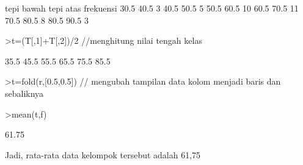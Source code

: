 \documentclass[a4paper,10pt]{article}
\begin{document}
\begin{eulernotebook}
\begin{eulercomment}
\begin{eulercomment}
\begin{eulercomment}
\begin{eulercomment}
\begin{eulercomment}
\begin{eulercomment}
\begin{eulercomment}
\begin{eulercomment}
\begin{eulercomment}
\begin{eulercomment}
\begin{euleroutput}
   tepi bawah tepi atas frekuensi
         30.5      40.5         3
         40.5      50.5         5
         50.5      60.5        10
         60.5      70.5        11
         70.5      80.5         8
         80.5      90.5         3
\end{euleroutput}
\begin{eulerprompt}
>t=(T[,1]+T[,2])/2  //menghitung nilai tengah kelas
\end{eulerprompt}
\begin{euleroutput}
           35.5 
           45.5 
           55.5 
           65.5 
           75.5 
           85.5 
\end{euleroutput}
\begin{eulerprompt}
>t=fold(r,[0.5,0.5]) // mengubah tampilan data kolom menjadi baris dan sebaliknya
\end{eulerprompt}
\begin{euleroutput}
  [35.5,  45.5,  55.5,  65.5,  75.5,  85.5]
\end{euleroutput}
\begin{eulerprompt}
>mean(t,f)
\end{eulerprompt}
\begin{euleroutput}
  61.75
\end{euleroutput}
\begin{eulercomment}
Jadi, rata-rata data kelompok tersebut adalah 61,75


\end{eulercomment}
\end{eulercomment}
\end{eulercomment}
\end{eulercomment}
\end{eulercomment}
\end{eulercomment}
\end{eulercomment}
\end{eulercomment}
\end{eulercomment}
\end{eulercomment}
\end{eulercomment}
\end{eulernotebook}
\end{document}
